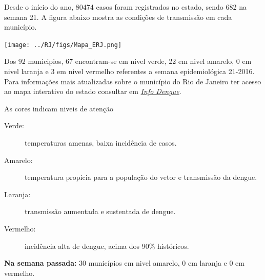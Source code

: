\documentclass[10pt]{article} %
\begin{document}
\begin{minipage}[t]{.66\linewidth} %

\hypertarget{estado}{} %

Desde o início do ano, 80474 casos foram registrados no estado, sendo 682 na semana 21. A figura abaixo mostra as condições de transmissão em cada município.

\texttt{[image: ../RJ/figs/Mapa\_ERJ.png]}

Dos 92 municipios, 67 encontram-se em nivel verde, 22 em nivel amarelo, 0 em nivel laranja e 3 em nivel vermelho referentes a semana epidemiológica 21-2016. Para informações mais atualizadas
sobre o município do Rio de Janeiro ter acesso ao mapa interativo do estado consultar em \href{http://info.dengue.mat.br}{\textit{Info Dengue}}.


\vspace{1cm}
\begin{mdframed}[style=intextbox,frametitle={}] %

\hypertarget{descriptivebox}{} %
As cores indicam niveis de atenção
\begin{description}
\item[Verde:] temperaturas amenas, baixa incidência de casos.      
\item[Amarelo:] temperatura propícia para a população do vetor e transmissão da dengue.
\item[Laranja:] transmissão aumentada e sustentada de dengue. 
\item[Vermelho:] incidência alta de dengue, acima dos 90\% históricos.
\end{description}
\end{mdframed}

\textbf{Na semana passada:} 30 municípios em nivel amarelo, 0 em laranja e 0 em vermelho.  

\end{minipage} %
\end{document}
